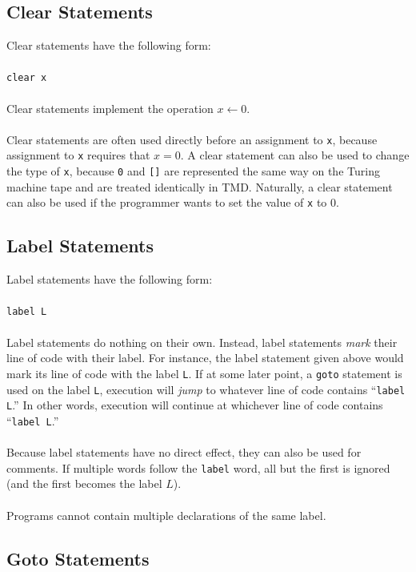 \documentclass[11pt]{report}
\begin{document}
\subsection{Clear Statements}

Clear statements have the following form: \\ \\
\texttt{clear x} \\ \\ 
Clear statements implement the operation $x \leftarrow 0$. \\ \\
Clear statements are often used directly before an assignment to \texttt{x}, because assignment to \texttt{x} requires that $x = 0$. A clear statement can also be used to change the type of \texttt{x}, because \texttt{0} and \texttt{[]} are represented the same way on the Turing machine tape and are treated identically in TMD. Naturally, a clear statement can also be used if the programmer wants to set the value of \texttt{x} to 0. \\

\subsection{Label Statements}

Label statements have the following form: \\ \\ 
\texttt{label L} \\ \\
Label statements do nothing on their own. Instead, label statements \emph{mark} their line of code with their label. For instance, the label statement given above would mark its line of code with the label \texttt{L}. If at some later point, a \texttt{goto} statement is used on the label \texttt{L}, execution will \emph{jump} to whatever line of code contains ``\texttt{label L}.'' In other words, execution will continue at whichever line of code contains ``\texttt{label L}.'' \\ \\
Because label statements have no direct effect, they can also be used for comments. If multiple words follow the \texttt{label} word, all but the first is ignored (and the first becomes the label $L$). \\ \\
Programs cannot contain multiple declarations of the same label.

\subsection{Goto Statements}
\end{document}
